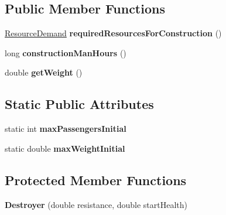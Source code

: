 \subsection*{Public Member Functions}
\begin{DoxyCompactItemize}
\item 
\hyperlink{classuniverse_1_1_resource_demand}{Resource\+Demand} {\bfseries required\+Resources\+For\+Construction} ()\hypertarget{classtools_1_1vehicles_1_1sea_1_1_destroyer_afa216599509301484d5f93196c0636b9}{}\label{classtools_1_1vehicles_1_1sea_1_1_destroyer_afa216599509301484d5f93196c0636b9}

\item 
long {\bfseries construction\+Man\+Hours} ()\hypertarget{classtools_1_1vehicles_1_1sea_1_1_destroyer_a61a18fe9c7845354180e54dcec9d62eb}{}\label{classtools_1_1vehicles_1_1sea_1_1_destroyer_a61a18fe9c7845354180e54dcec9d62eb}

\item 
double {\bfseries get\+Weight} ()\hypertarget{classtools_1_1vehicles_1_1sea_1_1_destroyer_a470bae2576c06e0686cefc42a97ef16c}{}\label{classtools_1_1vehicles_1_1sea_1_1_destroyer_a470bae2576c06e0686cefc42a97ef16c}

\end{DoxyCompactItemize}
\subsection*{Static Public Attributes}
\begin{DoxyCompactItemize}
\item 
static int {\bfseries max\+Passengers\+Initial}\hypertarget{classtools_1_1vehicles_1_1sea_1_1_destroyer_abe8c91c66da6ae5639d5f4a90b900f90}{}\label{classtools_1_1vehicles_1_1sea_1_1_destroyer_abe8c91c66da6ae5639d5f4a90b900f90}

\item 
static double {\bfseries max\+Weight\+Initial}\hypertarget{classtools_1_1vehicles_1_1sea_1_1_destroyer_adc78fcee7683fb6b5300babca5c4fee4}{}\label{classtools_1_1vehicles_1_1sea_1_1_destroyer_adc78fcee7683fb6b5300babca5c4fee4}

\end{DoxyCompactItemize}
\subsection*{Protected Member Functions}
\begin{DoxyCompactItemize}
\item 
{\bfseries Destroyer} (double resistance, double start\+Health)\hypertarget{classtools_1_1vehicles_1_1sea_1_1_destroyer_a6cd1cfb85dbd938be94b56ff5278f31d}{}\label{classtools_1_1vehicles_1_1sea_1_1_destroyer_a6cd1cfb85dbd938be94b56ff5278f31d}

\end{DoxyCompactItemize}
